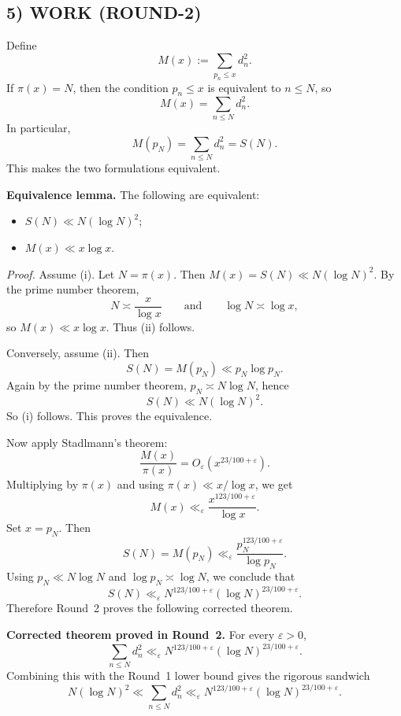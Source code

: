 \subsection*{5) WORK (ROUND-2)}
Define
\[
M(x):=\sum_{p_n\le x} d_n^2.
\]
If $\pi(x)=N$, then the condition $p_n\le x$ is equivalent to $n\le N$, so
\[
M(x)=\sum_{n\le N} d_n^2.
\]
In particular,
\[
M(p_N)=\sum_{n\le N} d_n^2 = S(N).
\]
This makes the two formulations equivalent.

\medskip
\noindent\textbf{Equivalence lemma.}
The following are equivalent:
\begin{itemize}
\item[(i)] $S(N)\ll N(\log N)^2$;
\item[(ii)] $M(x)\ll x\log x$.
\end{itemize}

\noindent\emph{Proof.}
Assume (i).  Let $N=\pi(x)$.  Then $M(x)=S(N)\ll N(\log N)^2$.  By the prime number theorem,
\[
N\asymp \frac{x}{\log x}
\qquad\mbox{and}\qquad
\log N\asymp \log x,
\]
so $M(x)\ll x\log x$.  Thus (ii) follows.

Conversely, assume (ii).  Then
\[
S(N)=M(p_N)\ll p_N\log p_N.
\]
Again by the prime number theorem, $p_N\asymp N\log N$, hence
\[
S(N)\ll N(\log N)^2.
\]
So (i) follows.  This proves the equivalence.

\medskip
Now apply Stadlmann's theorem:
\[
\frac{M(x)}{\pi(x)}=O_{\varepsilon}(x^{23/100+\varepsilon}).
\]
Multiplying by $\pi(x)$ and using $\pi(x)\ll x/\log x$, we get
\[
M(x)\ll_{\varepsilon} \frac{x^{123/100+\varepsilon}}{\log x}.
\]
Set $x=p_N$.  Then
\[
S(N)=M(p_N)\ll_{\varepsilon} \frac{p_N^{123/100+\varepsilon}}{\log p_N}.
\]
Using $p_N\ll N\log N$ and $\log p_N\asymp \log N$, we conclude that
\[
S(N)\ll_{\varepsilon} N^{123/100+\varepsilon}(\log N)^{23/100+\varepsilon}.
\]
Therefore Round~2 proves the following corrected theorem.

\medskip
\noindent\textbf{Corrected theorem proved in Round~2.}
For every $\varepsilon>0$,
\[
\sum_{n\le N} d_n^2 \ll_{\varepsilon} N^{123/100+\varepsilon}(\log N)^{23/100+\varepsilon}.
\]
Combining this with the Round~1 lower bound gives the rigorous sandwich
\[
N(\log N)^2 \ll \sum_{n\le N} d_n^2 \ll_{\varepsilon} N^{123/100+\varepsilon}(\log N)^{23/100+\varepsilon}.
\]

